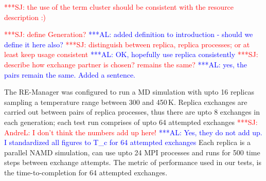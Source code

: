 \documentclass{rspublic}
\newcommand{\alnote}[1]{ {\textcolor{blue} { ***AL: #1 }}}
\newcommand{\jhanote}[1]{ {\textcolor{red} { ***SJ: #1 }}}
\newcommand{\alnote}[1]{}
\newcommand{\jhanote}[1]{}
\begin{document}
\jhanote{the use of the term cluster should be consistent with the
  resource description :)}


\jhanote{define Generation?}  \alnote{added definition to introduction
  - should we define it here also?}  \jhanote{distinguish between
  replica, replica processes; or at least keep usage consistent}
\alnote{OK, hopefully use replica consistently} \jhanote{describe how
  exchange partner is chosen? remains the same?}\alnote{yes, the pairs
  remain the same. Added a sentence.}


The RE-Manager was configured to run a MD simulation with upto 16
replicas sampling a temperature range between 300 and 450\,K. Replica
exchanges are carried out between pairs of replica processes, thus
there are upto 8 exchanges in each generation; each test run comprises
of upto 64 attempted exchanges\jhanote{AndreL: I don't think the
  numbers add up here!}  \alnote{Yes, they do not add up. I
  standardized all figures to T\_c for 64 attempted exchanges} Each
replica is a parallel NAMD simulation, can use upto 24 MPI processes
and runs for 500 time steps between exchange attempts. The metric of
performance used in our tests, is the time-to-completion for 64
attempted exchanges.
\end{document}
